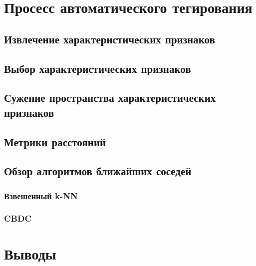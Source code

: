 \section{Просесс автоматического тегирования}

\subsection{Извлечение характеристических признаков}
\subsection{Выбор характеристических признаков}
\subsection{Сужение пространства характеристических признаков}
\subsection{Метрики расстояний}
\subsection{Обзор алгоритмов ближайших соседей}
\subsubsection{Взвешенный k-NN}
\subsubsection{CBDC}
\section{Выводы}





